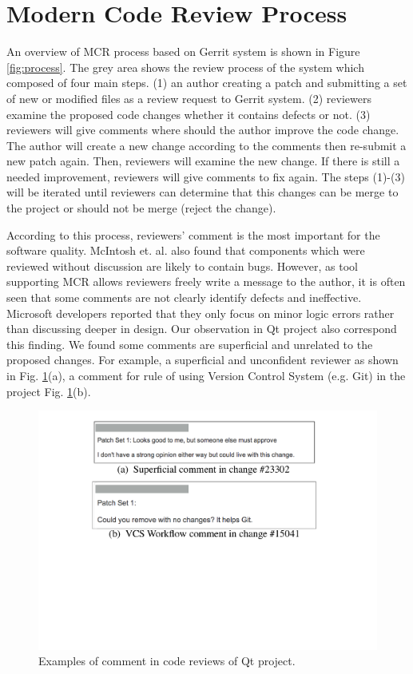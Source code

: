 \documentclass[conference]{IEEEtran}
\begin{document}
\section{Modern Code Review Process}

An overview of MCR process based on Gerrit system is shown in Figure \ref{fig:process}. The grey area shows the review process of the system which composed of four main steps. (1) an author creating a patch and submitting a set of new or modified files as a review request to Gerrit system. (2) reviewers examine the proposed code changes whether it contains defects or not. (3) reviewers will give comments where should the author improve the code change. The author will create a new change according to the comments then re-submit a new patch again. Then, reviewers will examine the new change. If there is still a needed improvement, reviewers will give comments to fix again. The steps (1)-(3) will be iterated until reviewers can determine that this changes can be merge to the project or should not be merge (reject the change). 

According to this process, reviewers' comment is the most important for the software quality. McIntosh et. al. \cite{Mcintosh} also found that components which were reviewed without discussion are likely to contain bugs. However, as tool supporting MCR allows reviewers freely write a message to the author, it is often seen that some comments are not clearly identify defects and ineffective. Microsoft developers reported that they only focus on minor logic errors rather than discussing deeper in design\cite{Bacchelli2013a}. Our observation in Qt project also correspond this finding. We found some comments are superficial and unrelated to the proposed changes. For example, a superficial and unconfident reviewer as shown in Fig. \ref{fig:example}(a), a comment for rule of using Version Control System (e.g. Git) in the project Fig. \ref{fig:example}(b). 

\begin{figure}[!t]
\centering
\includegraphics[scale=0.4, trim= 100 250 0 0, clip=true]{comment_examples}
\caption{Examples of comment in code reviews of Qt project.}
\label{fig:example}
\end{figure}
\end{document}
